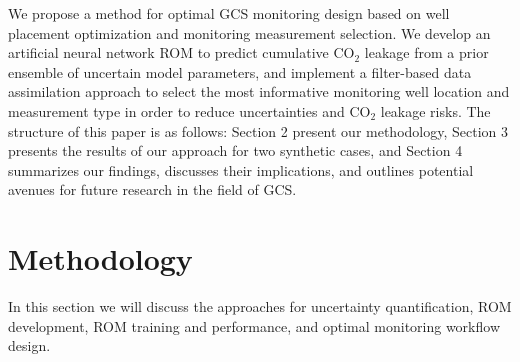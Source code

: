 \documentclass[a4paper,fleqn]{cas-sc}
\begin{document}
We propose a method for optimal GCS monitoring design based on well placement optimization and monitoring measurement selection. We develop an artificial neural network ROM to predict cumulative CO$_2$ leakage from a prior ensemble of uncertain model parameters, and implement a filter-based data assimilation approach to select the most informative monitoring well location and measurement type in order to reduce uncertainties and CO$_2$ leakage risks. The structure of this paper is as follows: Section 2 present our methodology, Section 3 presents the results of our approach for two synthetic cases, and Section 4 summarizes our findings, discusses their implications, and outlines potential avenues for future research in the field of GCS.

\section{Methodology}
In this section we will discuss the approaches for uncertainty quantification, ROM development, ROM training and performance, and optimal monitoring workflow design.
\end{document}
